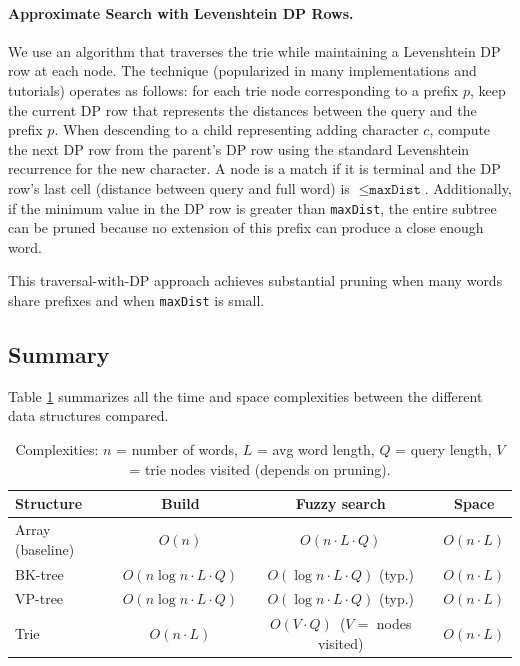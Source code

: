 \documentclass[acmsmall,screen, nonacm]{acmart}
\begin{document}
\paragraph{Approximate Search with Levenshtein DP Rows.}
We use an algorithm that traverses the trie while maintaining a Levenshtein DP row at each node. The technique (popularized in many implementations and tutorials) operates as follows: for each trie node corresponding to a prefix $p$, keep the current DP row that represents the distances between the query and the prefix $p$. When descending to a child representing adding character $c$, compute the next DP row from the parent's DP row using the standard Levenshtein recurrence for the new character. A node is a match if it is terminal and the DP row's last cell (distance between query and full word) is $\le\texttt{maxDist}$. Additionally, if the minimum value in the DP row is greater than \texttt{maxDist}, the entire subtree can be pruned because no extension of this prefix can produce a close enough word.

This traversal-with-DP approach achieves substantial pruning when many words share prefixes and when \texttt{maxDist} is small.

\subsection{Summary}

Table \ref{tab:complexities_concise} summarizes all the time and space complexities between the different data structures compared.

\begin{table}[ht]
	\centering
	\small
	\begin{tabular}{|l|c|c|c|}
		\hline
		\textbf{Structure} & \textbf{Build}             & \textbf{Fuzzy search}               & \textbf{Space} \\
		\hline
		Array (baseline)   & $O(n)$                     & $O(n\cdot L\cdot Q)$                & $O(n\cdot L)$  \\
		\hline
		BK-tree            & $O(n\log n\cdot L\cdot Q)$ & $O(\log n\cdot L\cdot Q)$ (typ.)    & $O(n\cdot L)$  \\
		\hline
		VP-tree            & $O(n\log n\cdot L\cdot Q)$ & $O(\log n\cdot L\cdot Q)$ (typ.)    & $O(n\cdot L)$  \\
		\hline
		Trie               & $O(n\cdot L)$              & $O(V\cdot Q)$\ ($V=$ nodes visited) & $O(n\cdot L)$  \\
		\hline
	\end{tabular}
	\caption{Complexities: $n$ = number of words, $L$ = avg word length, $Q$ = query length, $V$ = trie nodes visited (depends on pruning).}
	\label{tab:complexities_concise}
\end{table}
\end{document}
